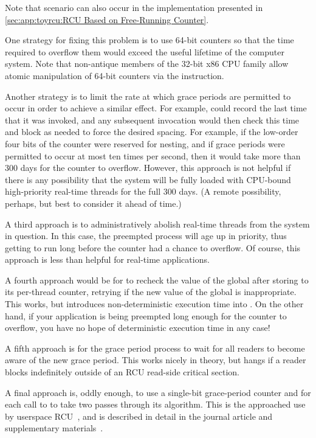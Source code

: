{{	Note that scenario can also occur in the implementation presented in
	\cref{sec:app:toyrcu:RCU Based on Free-Running Counter}.

	One strategy for fixing this problem is to use 64-bit
	counters so that the time required to overflow them would exceed
	the useful lifetime of the computer system.
	Note that non-antique members of the 32-bit x86 CPU family
	allow atomic manipulation of 64-bit counters via the
	 instruction.

	Another strategy is to limit the rate at which grace periods are
	permitted to occur in order to achieve a similar effect.
	For example,  could record the last time
	that it was invoked, and any subsequent invocation would then
	check this time and block as needed to force the desired
	spacing.
	For example, if the low-order four bits of the counter were
	reserved for nesting, and if grace periods were permitted to
	occur at most ten times per second, then it would take more
	than 300 days for the counter to overflow.
	However, this approach is not helpful if there is any possibility
	that the system will be fully loaded with CPU-bound high-priority
	real-time threads for the full 300 days.
	(A remote possibility, perhaps, but best to consider it ahead
	of time.)

	A third approach is to administratively abolish real-time threads
	from the system in question.
	In this case, the preempted process will age up in priority,
	thus getting to run long before the counter had a chance to
	overflow.
	Of course, this approach is less than helpful for real-time
	applications.

	A fourth approach would be for  to recheck
	the value of the global  after storing to its
	per-thread  counter, retrying if the new
	value of the global  is inappropriate.
	This works, but introduces non-deterministic execution time
	into .
	On the other hand, if your application is being preempted long
	enough for the counter to overflow, you have no hope of
	deterministic execution time in any case!

	A fifth approach is for the grace period process to wait for
	all readers to become aware of the new grace period.
	This works nicely in theory, but hangs if a reader blocks
	indefinitely outside of an RCU read-side critical section.

	A final approach is, oddly enough, to use a single-bit
	grace-period counter and for each call to 
	to take two passes through its algorithm.
	This is the approached use by userspace
	RCU~\cite{MathieuDesnoyers2009URCU}, and is described in
	detail in the journal article and supplementary
	materials~\cite[Appendix D]{MathieuDesnoyers2012URCU}.
}\QuickQuizEndE
}

